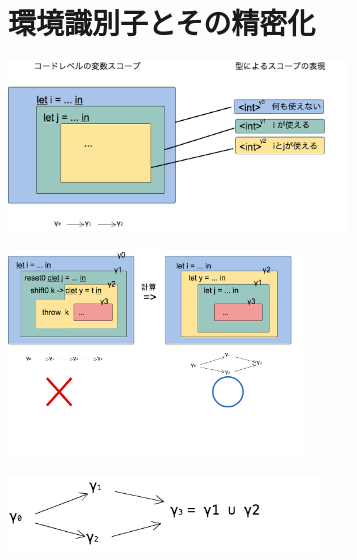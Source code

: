 
\section{環境識別子とその精密化}


\begin{center}
  \includegraphics[clip,height=4.5cm]{./img/ec_let.png}
\end{center}

\begin{center}
  \includegraphics[clip,height=5.5cm]{./img/ecex_let.png}
\end{center}

\begin{center}
  \includegraphics[clip,height=2cm]{./img/gamma.png}
\end{center}

